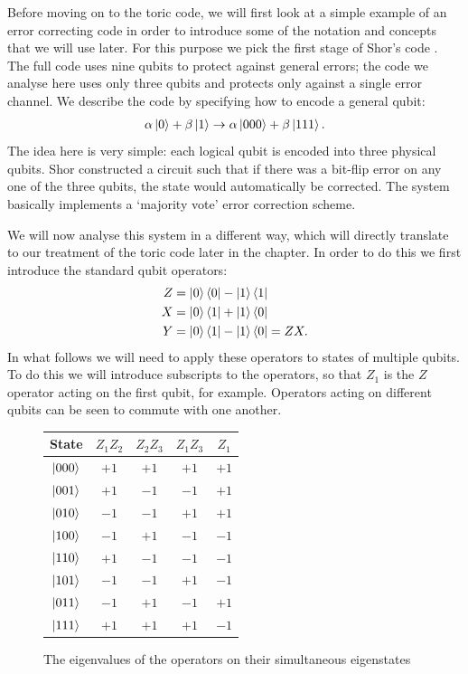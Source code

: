 Before moving on to the toric code, we will first look at a simple example of an error correcting code in order to introduce some of the notation and concepts that we will use later. For this purpose we pick the first stage of Shor's code \cite{shor_codes_95}. The full code uses nine qubits to protect against general errors; the code we analyse here uses only three qubits and protects only against a single error channel. We describe the code by specifying how to encode a general qubit:
\begin{align}\label{shor_state}
  \alpha\left\vert0\right\rangle + \beta\left\vert1\right\rangle \rightarrow \alpha\left\vert000\right\rangle + \beta\left\vert111\right\rangle.
\end{align}
The idea here is very simple: each logical qubit is encoded into three physical qubits. Shor constructed a circuit such that if there was a bit-flip error on any one of the three qubits, the state would automatically be corrected. The system basically implements a `majority vote' error correction scheme.

We will now analyse this system in a different way, which will directly translate to our treatment of the toric code later in the chapter. In order to do this we first introduce the standard qubit operators:
\begin{align}
  Z &= \left\vert0\right\rangle\left\langle 0\right\vert - \left\vert1\right\rangle\left\langle 1\right\vert \\
  X &= \left\vert0\right\rangle\left\langle 1\right\vert + \left\vert1\right\rangle\left\langle 0\right\vert \\
  Y &= \left\vert0\right\rangle\left\langle 1\right\vert - \left\vert1\right\rangle\left\langle 0\right\vert = ZX.
\end{align}
In what follows we will need to apply these operators to states of multiple qubits. To do this we will introduce subscripts to the operators, so that $Z_1$ is the $Z$ operator acting on the first qubit, for example. Operators acting on different qubits can be seen to commute with one another.

\begin{figure}\label{ops_states}
  \begin{center}
    \begin{tabular}{c c c c c}
      State & $Z_1 Z_2$ & $Z_2 Z_3$ & $Z_1 Z_3$ & $Z_1$ \\
      \hline
      $\left\vert000\right\rangle$ & $+1$ & $+1$ & $+1$ & $+1$ \\
      $\left\vert001\right\rangle$ & $+1$ & $-1$ & $-1$ & $+1$ \\
      $\left\vert010\right\rangle$ & $-1$ & $-1$ & $+1$ & $+1$ \\
      $\left\vert100\right\rangle$ & $-1$ & $+1$ & $-1$ & $-1$ \\
      $\left\vert110\right\rangle$ & $+1$ & $-1$ & $-1$ & $-1$ \\
      $\left\vert101\right\rangle$ & $-1$ & $-1$ & $+1$ & $-1$ \\
      $\left\vert011\right\rangle$ & $-1$ & $+1$ & $-1$ & $+1$ \\
      $\left\vert111\right\rangle$ & $+1$ & $+1$ & $+1$ & $-1$
    \end{tabular}
  \end{center}
  \caption{The eigenvalues of the operators on their simultaneous eigenstates}
\end{figure}

